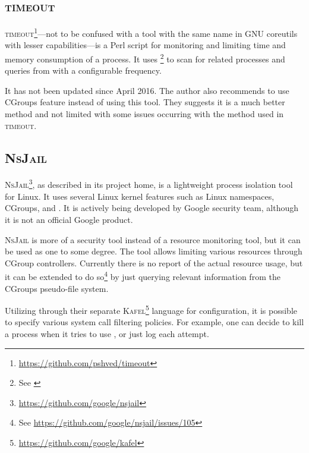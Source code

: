 \subsection{\textsc{timeout}}

\textsc{timeout}\footnote{\href{https://github.com/pshved/timeout}{https://github.com/pshved/timeout}}---not to be confused with a tool with the same name in GNU coreutils with lesser capabilities---is a Perl script for monitoring and limiting time and memory consumption of a process.
It uses \footnote{See \href{https://linux.die.net/man/1/ps}{}} to scan for related processes and queries from  with a configurable frequency.

It has not been updated since April 2016.
The author also recommends to use CGroups feature instead of using this tool.
They suggests it is a much better method and not limited with some issues occurring with the method used in \textsc{timeout}.

\subsection{\textsc{NsJail}}
\label{sec:resource.impl.nsjail}

\textsc{NsJail}\footnote{\href{https://github.com/google/nsjail}{https://github.com/google/nsjail}}, as described in its project home, is a lightweight process isolation tool for Linux.
It uses several Linux kernel features such as Linux namespaces, CGroups, and .
It is actively being developed by Google security team, although it is not an official Google product.

\textsc{NsJail} is more of a security tool instead of a resource monitoring tool, but it can be used as one to some degree.
The tool allows limiting various resources through CGroup controllers.
Currently there is no report of the actual resource usage, but it can be extended to do so\footnote{See \href{https://github.com/google/nsjail/issues/105}{https://github.com/google/nsjail/issues/105}} by just querying relevant information from the CGroups pseudo-file system.

Utilizing  through their separate \textsc{Kafel}\footnote{\href{https://github.com/google/kafel}{https://github.com/google/kafel}} language for configuration, it is possible to specify various system call filtering policies.
For example, one can decide to kill a process when it tries to use , or just log each attempt.


